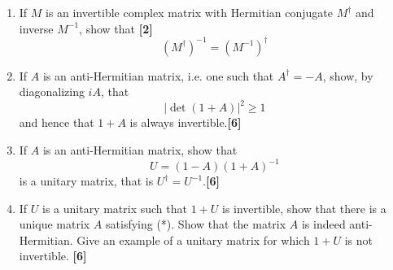 \documentclass[a4paper]{article}
\begin{document}
\newpage
\begin{qns}\leavevmode
\begin{enumerate}[label=(\roman*)]
\item If $M$ is an invertible complex matrix with Hermitian conjugate $M^\dag$ and inverse $M^{−1}$, show that \hfill \textbf{[2]}
$$(M^\dag)^{−1} = (M^{−1})^\dag$$
\item If $A$ is an anti-Hermitian matrix, i.e. one such that $A^\dag=-A$, show, by diagonalizing $iA$, that
$$|\det(1 + A)|^2\geq1$$
and hence that $1 + A$ is always invertible.\hfill \textbf{[6]}
\item If $A$ is an anti-Hermitian matrix, show that
\begin{equation}
    U = (1 − A)(1 + A)^{-1}\tag{*}
\end{equation}
is a unitary matrix, that is $U^\dag = U^{−1}$.\hfill \textbf{[6]}
\item If $U$ is a unitary matrix such that $1 + U$ is invertible, show that there is a unique matrix $A$ satisfying (*). Show that the matrix $A$ is indeed anti-Hermitian. Give an example of a unitary matrix for which $1 + U$ is not invertible. \hfill \textbf{[6]}
\end{enumerate}
\end{qns}
\end{document}
